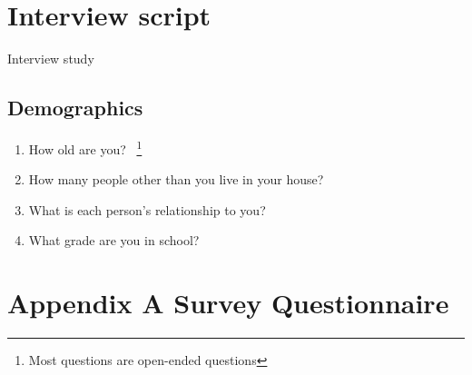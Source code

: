 \documentclass[conference]{IEEEtran}
\begin{document}
\section{Interview script}
Interview study 

\subsection*{ Demographics}

\begin{enumerate}
\item How old are you? ~\footnote{Most questions are open-ended questions}\\
\item How many people other than you live in your house?\\ 
\item What is each person's relationship to you?\\
\item What grade are you in school?\\
\end{enumerate}
\fi
\appendices

\section {Appendix A Survey Questionnaire}



\end{document}
